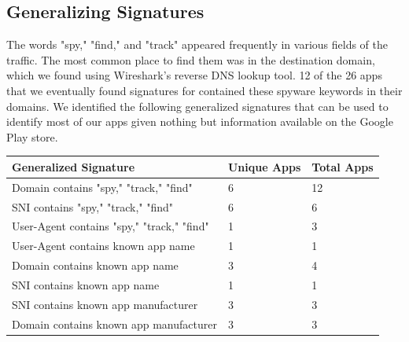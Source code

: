 \documentclass[acmtog]{acmart}
\begin{document}
\subsection{Generalizing Signatures}

The words "spy," "find," and "track" appeared frequently in 
various fields of the traffic. The most common place to find them was in the 
destination domain, which we found using Wireshark's reverse DNS lookup tool. 
12 of the 26 apps that we eventually found signatures for contained these 
spyware keywords in their domains. We identified the following generalized 
signatures that can be used to identify most of our apps given nothing but 
information available on the Google Play store.

\begin{table}
	\begin{tabular}{p{5cm}p{5cm}p{5cm}}
		\toprule
		Generalized Signature & Unique Apps & Total Apps \\
		\hline
		Domain contains "spy," "track," "find" & 6 & 12 \\
		SNI contains "spy," "track," "find" & 6 & 6 \\
		User-Agent contains "spy," "track," "find" & 1 & 3 \\
		User-Agent contains known app name & 1 & 1 \\
		Domain contains known app name & 3 & 4 \\
		SNI contains known app name & 1 & 1 \\
		SNI contains known app manufacturer & 3 & 3 \\
		Domain contains known app manufacturer & 3 & 3 \\
		\midrule
	\end{tabular}
\end{table}
\end{document}
